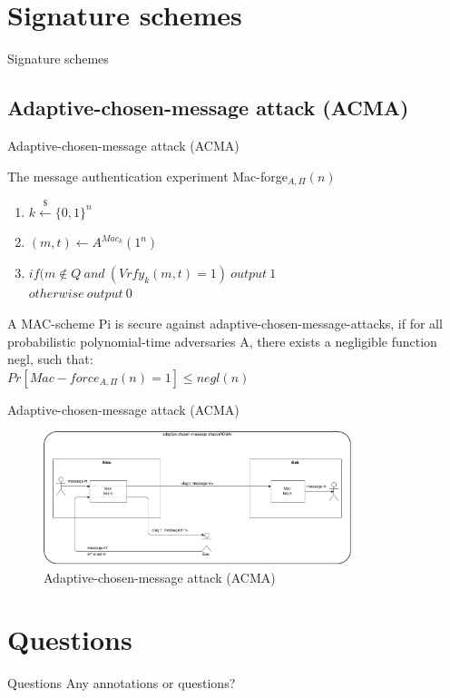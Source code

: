\documentclass[ucs,9pt]{beamer}
\begin{document}
%
%
\section{Signature schemes}

\begin{frame}
    \centering
    \huge{Signature schemes}
\end{frame}

\subsection{Adaptive-chosen-message attack (ACMA)}

\begin{frame}{Adaptive-chosen-message attack (ACMA)}
    \begin{block}{The message authentication experiment Mac-forge$_{A,\Pi}(n)$}
        \begin{enumerate}
            \item $k \overset{\$}{\leftarrow} \{0,1\}^n$
            \item $(m, t) \leftarrow A^{Mac_{k}}(1^{n})$
            \item $if(m \notin Q\ and\ (Vrfy_{k}(m, t) = 1)\ output\ 1$\\
            $otherwise\ output\ 0$
        \end{enumerate}
        
        A MAC-scheme Pi is secure against adaptive-chosen-message-attacks, if for all probabilistic polynomial-time adversaries A, there exists a negligible function negl, such that:\\
        $Pr[Mac-force_{A,\Pi}(n) = 1] \leq negl(n)$
    \end{block}
\end{frame}

\begin{frame}{Adaptive-chosen-message attack (ACMA)}
    \begin{figure}[h]
        \centering
        \includegraphics[width=0.8\textwidth]{figures/ACMA.png}
        \caption{Adaptive-chosen-message attack (ACMA)}
    \end{figure}
\end{frame}


\section*{Questions}

\begin{frame}{Questions}
    \huge{Any annotations or questions?}
\end{frame}
\end{document}

